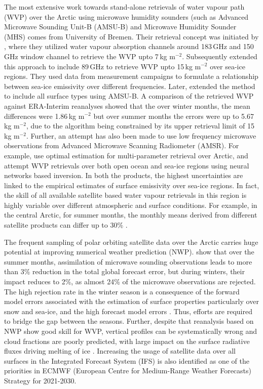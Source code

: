 \documentclass[12pt,oneside,a4paper]{article}
\begin{document}
The most extensive work towards stand-alone retrievals of water vapour path
(WVP) over the Arctic using microwave humidity sounders (such as Advanced Microwave Sounding Unit-B (AMSU-B) and Microwave Humidity Sounder (MHS) comes from University of Bremen. Their retrieval concept was initiated by \citet{miao:2001:atmos}, where they utilized water vapour absorption channels around 183\,GHz and 150\,GHz window channel to retrieve the WVP upto 7\,kg m$^{-2}$. Subsequently \citet{melsheimer:2008:impro} extended this approach to include 89\,GHz to retrieve WVP upto 15\,kg m$^{-2}$ over sea-ice regions. They used data from
measurement campaigns to formulate a relationship between sea-ice emissivity
over different frequencies. Later, \citet{scarlat:2018:retri} extended the
method to include all surface types using AMSU-B. A comparison of the retrieved
WVP against ERA-Interim reanalyses showed that the over winter months, the mean differences were 1.86\,kg m$^{-2}$ but over summer months the errors were up to 5.67\,kg
m$^{-2}$, due to the algorithm being constrained by its upper retrieval limit of
15\,kg m$^{-2}$. Further, an attempt has also been made to use low
frequency microwave observations from Advanced Microwave Scanning Radiometer
(AMSR). For example, \citet{scarlat:2017:exper} use optimal estimation for multi-parameter retrieval over Arctic, and \citet{zabolotskikh:2020:anadv}
attempt WVP retrievals over both open ocean and sea-ice regions using neural
networks based inversion. In both the products, the highest uncertainties are linked to the empirical estimates of surface emissivity over
sea-ice regions. In fact, the skill of all available satellite based water
vapour retrievals in this region is highly variable over different atmospheric
and surface conditions. For example, in the central Arctic, for summer months,
the monthly means derived from different satellite products can differ up to
30\% \citep{crewell:2021:asyst}.

The frequent sampling of polar orbiting satellite data over the Arctic carries
huge potential at improving numerical weather prediction (NWP).
\citet{lawrence:2019:usean} show that over the summer months, assimilation of
microwave sounding observations leads to more than 3\% reduction in the total
global forecast error, but during winters, their impact reduces to 2\%, as
almost 24\% of the microwave observations are rejected. The high rejection rate
in the winter season is a consequence of the forward model errors associated
with the estimation of surface properties particularly over snow and sea-ice,
and the high forecast model errors \citep{bauer:2016:aspec}. Thus, efforts are
required to bridge the gap between the seasons. Further, despite that
reanalysis based on NWP show good skill for WVP, vertical profiles can be
systematically wrong and cloud fractions are poorly predicted, with large
impact on the surface radiative fluxes driving melting of ice
\citep{graham:2019:evalu}. Increasing the usage of satellite data over all
surfaces in the Integrated Forecast System (IFS) is also identified as one of the
priorities in ECMWF (European Centre for Medium-Range Weather Forecasts)
Strategy for 2021-2030.
\end{document}
